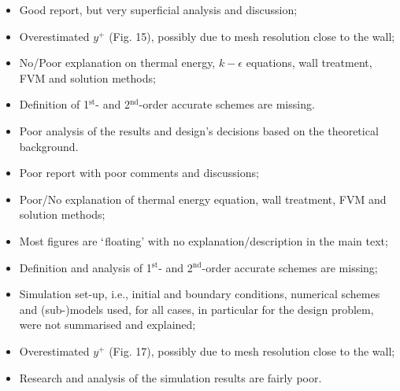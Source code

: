 \documentclass[14pt,twoside]{report}
\newcommand\blankpage{%
    \null
    \thispagestyle{empty}%
    \addtocounter{page}{-1}%
    \newpage}
\begin{document}


\bigskip


\medskip

  \begin{itemize}
%
     \item Good report, but very superficial analysis and discussion;
     \item Overestimated $y^{+}$ (Fig. 15), possibly due to mesh resolution close to the wall;
     \item No/Poor explanation on thermal energy, $k-\epsilon$ equations, wall treatment, FVM and solution methods;
     \item Definition of 1$^{\text{st}}$- and 2$^{\text{nd}}$-order accurate schemes are missing.
     \item Poor analysis of the results and design's decisions based on the theoretical background.
%
  \end{itemize}%

\clearpage 



\bigskip


\medskip

  \begin{itemize}
%
     \item Poor report with poor comments and discussions;
     \item Poor/No explanation of thermal energy equation, wall treatment, FVM and solution methods;
     \item Most figures are $\lq$floating' with no explanation/description in the main text;
     \item Definition and analysis of 1$^{\text{st}}$- and 2$^{\text{nd}}$-order accurate schemes are missing;
     \item Simulation set-up, i.e., initial and boundary conditions, numerical schemes and (sub-)models used, for all cases, in particular for the design problem, were not summarised and explained;
     \item Overestimated $y^{+}$ (Fig. 17), possibly due to mesh resolution close to the wall;
     \item Research and analysis of the simulation results are fairly poor.
%
  \end{itemize}%
\end{document}
